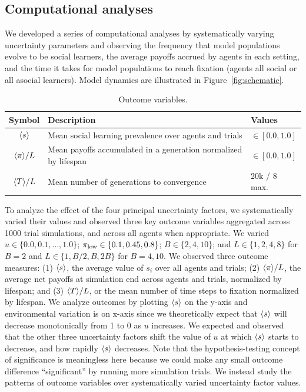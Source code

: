 \documentclass[letterpaper,11.5pt]{scrartcl}
\begin{document}
\clearpage


\subsection{Computational analyses}
\label{ssec:computationalAnalyses}

We developed a series of computational
analyses by systematically varying uncertainty parameters and observing the
frequency that model populations evolve to be social learners, the average payoffs
accrued by agents in each setting, and the time it takes for model populations to
reach fixation (agents all social or all asocial learners). Model dynamics are
illustrated in Figure~\ref{fig:schematic}. 

\begin{table}[h]
    \caption{Outcome variables.}
    \label{tab:outcomeVariables}
    \centering %
    \begin{tabular}{cp{4.25in}p{0.85in}} \toprule

        Symbol & Description & Values \\ 

        \midrule  

        $\langle s \rangle$ & Mean social learning prevalence over agents and trials
                  & $\in [0.0, 1.0]$ \\

        $\langle \pi \rangle / L$ & Mean payoffs accumulated in a generation normalized by
        lifespan & $\in [0.0, 1.0]$ \\

        $\langle T \rangle / L$ & Mean number of generations to convergence & 20k / 8 max. \\
        \bottomrule
    \end{tabular}
\end{table}

To analyze the effect of the four principal uncertainty factors, we systematically
varied their values and observed three key outcome variables aggregated across 1000
trial simulations, and across all agents when appropriate. We varied $u \in \{0.0,
0.1, \ldots, 1.0\}$; $\pi_{\mathrm{low}} \in \{0.1, 0.45, 0.8\}$; $B \in \{2, 4, 10\}$; and $L
\in \{1,2,4,8\}$ for $B=2$ and $L \in \{1,B/2,B,2B\}$ for $B=4,10$.  We observed
three outcome measures: (1) $\langle s \rangle$, the average value of $s_i$ over all agents
and trials; (2) $\langle \pi \rangle / L$, the average net payoffs at simulation end across
agents and trials, normalized by lifespan; and (3) $\langle T \rangle / L$, 
or the mean number of time steps to fixation normalized by
lifespan. We analyze outcomes by plotting $\langle s \rangle$ on the y-axis and environmental
variation is on x-axis since we theoretically expect that $\langle s \rangle$ will 
decrease monotonically from 1 to 0 as $u$ increases. We expected and observed
that the other three uncertainty factors shift the value of $u$ at which 
$\langle s \rangle$ starts to decrease, and how rapidly $\langle s \rangle$ decreases. Note that the
hypothesis-testing concept of significance is meaningless here because we could
make any small outcome difference ``significant'' by running more simulation trials.
We instead study the patterns of outcome 
variables over systematically varied uncertainty factor values. 
\end{document}
